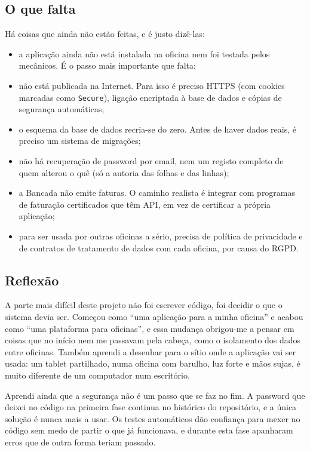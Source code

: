 \documentclass[a4paper,12pt]{article}
\begin{document}
\subsection{O que falta}

Há coisas que ainda não estão feitas, e é justo dizê-las:
\begin{itemize}
    \item a aplicação ainda não está instalada na oficina nem foi testada pelos mecânicos. É o passo mais importante que falta;
    \item não está publicada na Internet. Para isso é preciso HTTPS (com cookies marcadas como \texttt{Secure}), ligação encriptada à base de dados e cópias de segurança automáticas;
    \item o esquema da base de dados recria-se do zero. Antes de haver dados reais, é preciso um sistema de migrações;
    \item não há recuperação de password por email, nem um registo completo de quem alterou o quê (só a autoria das folhas e das linhas);
    \item a Bancada não emite faturas. O caminho realista é integrar com programas de faturação certificados que têm \ac{API}, em vez de certificar a própria aplicação;
    \item para ser usada por outras oficinas a sério, precisa de política de privacidade e de contratos de tratamento de dados com cada oficina, por causa do \ac{RGPD}.
\end{itemize}

\subsection{Reflexão}

A parte mais difícil deste projeto não foi escrever código, foi decidir o que o sistema devia ser. Começou como ``uma aplicação para a minha oficina'' e acabou como ``uma plataforma para oficinas'', e essa mudança obrigou-me a pensar em coisas que no início nem me passavam pela cabeça, como o isolamento dos dados entre oficinas. Também aprendi a desenhar para o sítio onde a aplicação vai ser usada: um tablet partilhado, numa oficina com barulho, luz forte e mãos sujas, é muito diferente de um computador num escritório.

Aprendi ainda que a segurança não é um passo que se faz no fim. A password que deixei no código na primeira fase continua no histórico do repositório, e a única solução é nunca mais a usar. Os testes automáticos dão confiança para mexer no código sem medo de partir o que já funcionava, e durante esta fase apanharam erros que de outra forma teriam passado.
\end{document}
